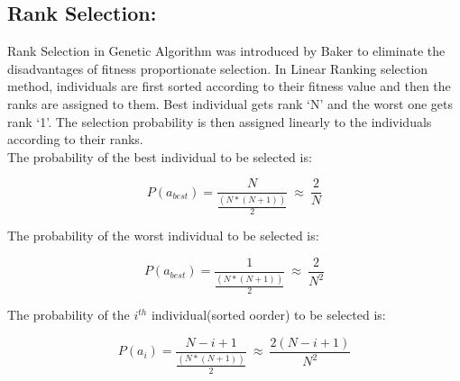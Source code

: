 \documentclass[a4paper, 12pt]{article}
\begin{document}
\subsection{Rank Selection:}
Rank Selection in Genetic Algorithm was introduced by Baker to eliminate the disadvantages of fitness proportionate selection. In Linear 
Ranking selection method, individuals are first sorted according to their fitness value and then the ranks are assigned to them. Best 
individual gets rank ‘N’ and the worst one gets rank ‘1’. The selection probability is then assigned linearly to the individuals according to 
their ranks.\\
The probability of the best individual to be selected is:
\begin{large}
\boldmath\begin{equation*}
P\left(a_{best}\right) = \frac{N}{\frac{\left(N*\left(N+1\right)\right)}{2}}\ \approx\ \frac{2}{N}
\end{equation*}
\end{large}
The probability of the worst individual to be selected is:
\begin{large}
\boldmath\begin{equation*}
P\left(a_{best}\right) = \frac{1}{\frac{\left(N*\left(N+1\right)\right)}{2}}\ \approx\ \frac{2}{N^2}
\end{equation*}
\end{large}
The probability of the $i^{th}$ individual(sorted oorder) to be selected is:
\begin{large}
\boldmath\begin{equation*}
P\left(a_i\right) = \frac{N-i+1}{\frac{\left(N*\left(N+1\right)\right)}{2}}\ \approx\ \frac{2\left(N-i+1\right)}{N^2}
\end{equation*}
\end{large}
\end{document}
